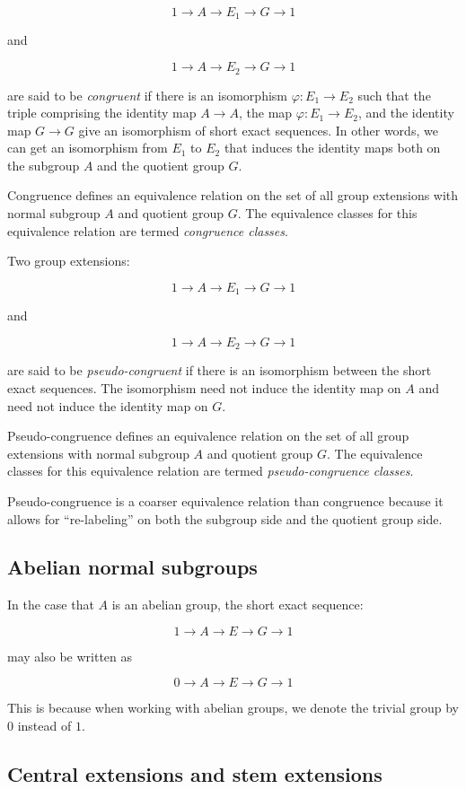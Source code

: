 $$1 \to A \to E_1 \to G \to 1$$

and

$$1 \to A \to E_2 \to G \to 1$$

are said to be {\em congruent} if there is an isomorphism $\varphi:
E_1 \to E_2$ such that the triple comprising the identity map $A \to
A$, the map $\varphi:E_1 \to E_2$, and the identity map $G \to G$ give
an isomorphism of short exact sequences. In other words, we can get an
isomorphism from $E_1$ to $E_2$ that induces the identity maps both on
the subgroup $A$ and the quotient group $G$.

Congruence defines an equivalence relation on the set of all
group extensions with normal subgroup $A$ and quotient group $G$. The
equivalence classes for this equivalence relation are termed {\em
  congruence classes}. 

Two group extensions:

$$1 \to A \to E_1 \to G \to 1$$

and

$$1 \to A \to E_2 \to G \to 1$$

are said to be {\em pseudo-congruent} if there is an isomorphism
between the short exact sequences. The isomorphism need not induce the
identity map on $A$ and need not induce the identity map on $G$.

Pseudo-congruence defines an equivalence relation on the set of all
group extensions with normal subgroup $A$ and quotient group $G$. The
equivalence classes for this equivalence relation are termed {\em
  pseudo-congruence classes}.

Pseudo-congruence is a coarser equivalence relation than congruence
because it allows for ``re-labeling'' on both the subgroup side and
the quotient group side.

\subsection{Abelian normal subgroups}

In the case that $A$ is an abelian group, the short exact sequence:

$$1 \to A \to E \to G \to 1$$

may also be written as

$$0 \to A \to E \to G \to 1$$

This is because when working with abelian groups, we denote the
trivial group by $0$ instead of $1$.

\subsection{Central extensions and stem extensions}\label{sec:central-and-stem-extension}

